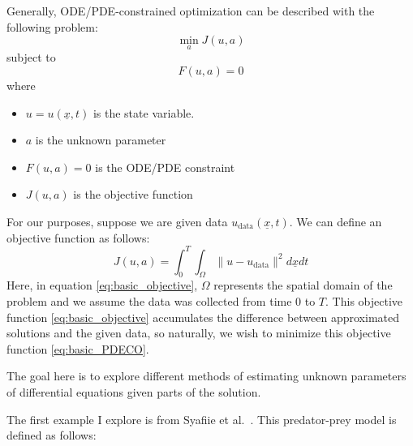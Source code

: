 \documentclass{article}
\begin{document}
Generally, ODE/PDE-constrained optimization can be described with the following problem:
\begin{equation}
    \min_a J(u,a)
    \label{eq:basic_PDECO}
\end{equation}
subject to
\begin{equation}
    F(u, a) = 0
    \label{eq:basic_PDECO_constraint}
\end{equation}
where
\begin{itemize}
    \item $u = u(\underline{x},t)$ is the state variable.
    \item $a$ is the unknown parameter
    \item $F(u, a) = 0$ is the ODE/PDE constraint
    \item $J(u,a)$ is the objective function
\end{itemize}
For our purposes, suppose we are given data $u_{\text{data}}(\underline{x},t)$. We can define an objective function as follows:
\begin{equation}
    J(u,a) = \int_0^T \int_\Omega \|u - u_{\text{data}}\|^2 d\underline{x} dt
    \label{eq:basic_objective}
\end{equation}
Here, in equation \eqref{eq:basic_objective}, $\Omega$ represents the spatial domain of the problem and we assume the data was collected from time $0$ to $T$. This objective function \eqref{eq:basic_objective} accumulates the difference between approximated solutions and the given data, so naturally, we wish to minimize this objective function \eqref{eq:basic_PDECO}.

The goal here is to explore different methods of estimating unknown parameters of differential equations given parts of the solution.

The first example I explore is from Syafiie et al.~\cite{syafiie2025systems}. This predator-prey model is defined as follows:
\end{document}
